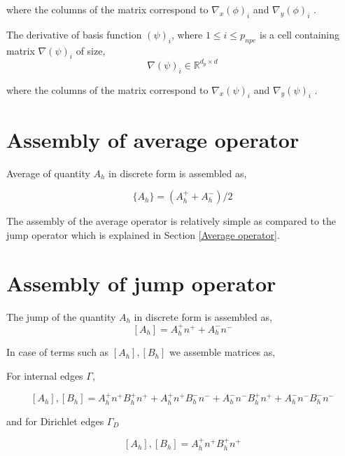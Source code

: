 \documentclass[a4paper]{book}
\begin{document}
where the columns of the matrix correspond to $\nabla_x (\phi)_{i}$ and $\nabla_y (\phi)_{i}$ .

The derivative of basis function $(\psi)_{i}$, where $1 \leq i \leq p_{npe}$ is a cell containing matrix $\nabla (\psi)_{i}$ of size,
\begin{equation}\label{basis_func_derivative_pressure_rbmatlab}
\nabla (\psi)_{i} \in \mathbb{R}^{{d_p} \times d}
\end{equation}

where the columns of the matrix correspond to $\nabla_x (\psi)_{i}$ and $\nabla_y (\psi)_{i}$ .

\section{Assembly of average operator}

Average of quantity $A_h$ in discrete form is assembled as,

\begin{equation}\label{Average operator}
\lbrace A_h \rbrace = (A_h^+ + A_h^-)/2
\end{equation}

The assembly of the average operator is relatively simple as compared to the jump operator which is explained in Section \ref{Average operator}.

\section{Assembly of jump operator} \label{Jump operator}

The jump of the quantity $A_h$ in discrete form is assembled as,
\begin{equation} \label{Jump_operator}
[A_h] = A_h^+ n^+ + A_h^- n^-
\end{equation}

In case of terms such as $[A_h],[B_h]$ we assemble matrices as, 

For internal edges $\Gamma$,

\begin{equation} \label{Jump operator L2}
[A_h],[B_h] = A_h^+ n^+ B_h^+ n^+ + A_h^+ n^+ B_h^- n^- + A_h^- n^- B_h^+ n^+ + A_h^- n^- B_h^- n^-
\end{equation}

and for Dirichlet edges $\Gamma_D$

\begin{equation} \label{Jump operator L2 for dirichlet}
[A_h],[B_h] = A_h^+ n^+ B_h^+ n^+ 
\end{equation}
\end{document}
